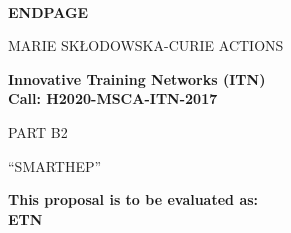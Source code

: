 \documentclass[11pt,a4paper]{article}
\def\acronym{SMARTHEP\xspace}
\begin{document}
\begin{center}

\mbox{ }\\[1ex
\vspace{1cm}]

{\LARGE\bf ENDPAGE}

\vspace{2.5cm}


{\LARGE MARIE SK\L ODOWSKA-CURIE ACTIONS}\\[2ex]

\vspace{2cm}

{\LARGE\bf Innovative Training Networks (ITN)\\
Call: H2020-MSCA-ITN-2017}\\[2ex]

\vspace{3.cm}

{\LARGE PART B2}

\vspace{2.5cm}

{\LARGE ``\acronym'' }

\vspace{2.5cm}


{\large\bf This proposal is to be evaluated as:}\\
{\large\bf ETN}

\vspace{2.cm}

\end{center}
\end{document}
